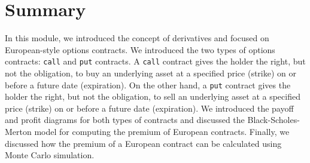 \documentclass[11pt]{article}
\theoremstyle{definition}
\begin{document}
\section*{Summary}
In this module, we introduced the concept of derivatives and focused on European-style options contracts. We introduced the two types of options contracts: \texttt{call} and \texttt{put} contracts. A \texttt{call} contract gives the holder the right, but not the obligation, to buy an underlying asset at a specified price (strike) on or before a future date (expiration). On the other hand, a \texttt{put} contract gives the holder the right, but not the obligation, to sell an underlying asset at a specified price (strike) on or before a future date (expiration). We introduced the payoff and profit diagrams for both types of contracts and discussed the Black-Scholes-Merton model for computing the premium of European contracts. Finally, we discussed how the premium of a European contract can be calculated using Monte Carlo simulation.



\clearpage
\printindex
\end{document}
